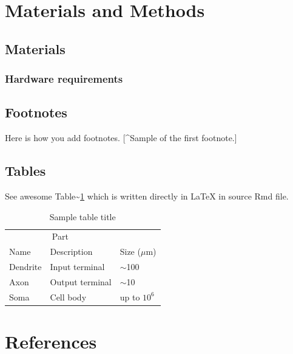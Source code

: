 \documentclass{article}
\begin{document}
\section{Materials and Methods}\label{materials-and-methods}

\subsection{Materials}\label{materials}

\subsubsection{Hardware requirements}\label{hardware-requirements}

\subsection{Footnotes}\label{footnotes}

Here is how you add footnotes. {[}\^{}Sample of the first footnote.{]}

\subsection{Tables}\label{tables}

See awesome Table\textasciitilde{}\ref{tab:table} which is written
directly in LaTeX in source Rmd file.

\begin{table}
 \caption{Sample table title}
  \centering
  \begin{tabular}{lll}
    \toprule
    \multicolumn{2}{c}{Part}                   \\
    \cmidrule(r){1-2}
    Name     & Description     & Size ($\mu$m) \\
    \midrule
    Dendrite & Input terminal  & $\sim$100     \\
    Axon     & Output terminal & $\sim$10      \\
    Soma     & Cell body       & up to $10^6$  \\
    \bottomrule
  \end{tabular}
  \label{tab:table}
\end{table}

\section*{References}\label{references}
\end{document}
